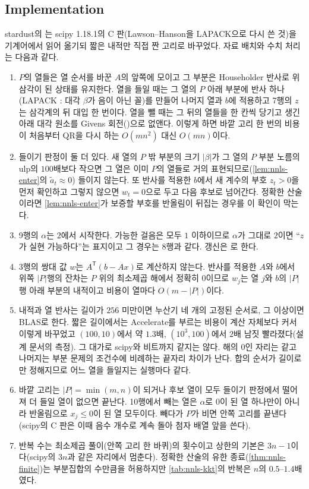 \subsection{Implementation}

stardust의 는 scipy 1.18.1의 C 판(Lawson--Hanson을 LAPACK으로 다시 쓴 것)을 기계어에서 읽어 옮기되 짧은 내적만 직접 짠 고리로 바꾸었다. 자료 배치와 수치 처리는 다음과 같다.
\begin{enumerate}
\item $P$의 열들은 열 순서를 바꾼 $A$의 앞쪽에 모이고 그 부분은 Householder 반사로 위 삼각이 된 상태를 유지한다. 열을 들일 때는 그 열의 $P$ 아래 부분에 반사 하나(LAPACK : 대각 $\beta$가 음이 아닌 꼴)를 만들어 나머지 열과 $b$에 적용하고 7행의 $z$는 삼각계의 뒤 대입 한 번이다. 열을 뺄 때는 그 뒤의 열들을 한 칸씩 당기고 생긴 아래 대각 원소를 Givens 회전()으로 없앤다. 이렇게 하면 바깥 고리 한 번의 비용이 처음부터 QR을 다시 하는 $O(mn^2)$ 대신 $O(mn)$이다.
\item 들이기 판정이 둘 더 있다. 새 열의 $P$ 밖 부분의 크기 $|\beta|$가 그 열의 $P$ 부분 노름의 ulp의 $100$배보다 작으면 그 열은 이미 $P$의 열들로 거의 표현되므로(\cref{lem:nnls-enter}의 $\tilde a_t\approx0$) 들이지 않는다. 또 반사를 적용한 $b$에서 새 계수의 부호 $z_t>0$을 먼저 확인하고 그렇지 않으면 $w_t=0$으로 두고 다음 후보로 넘어간다. 정확한 산술이라면 \cref{lem:nnls-enter}가 보증할 부호를 반올림이 뒤집는 경우를 이 확인이 막는다.
\item 9행의 $\alpha$는 $2$에서 시작한다. 가능한 걸음은 모두 $1$ 이하이므로 $\alpha$가 그대로 $2$이면 ``$z$가 실현 가능하다''는 표지이고 그 경우는 8행과 같다. 갱신은 로 한다.
\item 3행의 쌍대 값 $w$는 $A^{\mathsf T}(b-Ax)$로 계산하지 않는다. 반사를 적용한 $A$와 $b$에서 위쪽 $|P|$행의 잔차는 $P$ 위의 최소제곱 해에서 정확히 $0$이므로 $w_j$는 열 $j$와 $b$의 $|P|$행 아래 부분의 내적이고 비용이 열마다 $O(m-|P|)$이다.
\item 내적과 열 반사는 길이가 $256$ 미만이면 누산기 네 개의 고정된 순서로, 그 이상이면 BLAS로 한다. 짧은 길이에서는 Accelerate를 부르는 비용이 계산 자체보다 커서 이렇게 바꾸었고 $(100,10)$에서 약 $1.3$배, $(10^3,100)$에서 $2$배 남짓 빨라졌다(설계 문서의 측정). 그 대가로 scipy와 비트까지 같지는 않다. 해의 $0$인 자리는 같고 나머지는 부분 문제의 조건수에 비례하는 끝자리 차이가 난다. 합의 순서가 길이로만 정해지므로 어느 열을 들일지는 실행마다 같다.
\item 바깥 고리는 $|P|=\min(m,n)$이 되거나 후보 열이 모두 들이기 판정에서 떨어져 더 들일 열이 없으면 끝난다. 10행에서 빼는 열은 $\alpha$로 $0$이 된 열 하나만이 아니라 반올림으로 $x_j\le0$이 된 열 모두이다. 빼다가 $P$가 비면 안쪽 고리를 끝낸다(scipy의 C 판은 이때 음수 개수로 계속 돌아 첨자 배열 앞을 쓴다).
\item 반복 수는 최소제곱 풀이(안쪽 고리 한 바퀴)의 횟수이고 상한의 기본은 $3n-1$이다(scipy의 $3n$과 같은 자리에서 멈춘다). 정확한 산술의 유한 종료(\cref{thm:nnls-finite})는 부분집합의 수만큼을 허용하지만 \cref{tab:nnls-kkt}의 반복은 $n$의 $0.5$--$1.4$배였다.
\end{enumerate}

